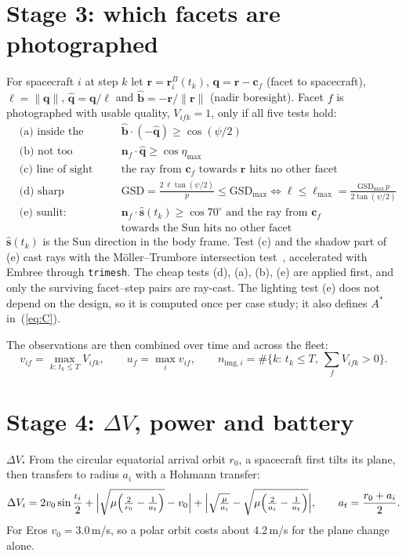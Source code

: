 \section{Stage 3: which facets are photographed}
\label{sec:visibility}
For spacecraft $i$ at step $k$ let $\mathbf{r}=\mathbf{r}^{B}_i(t_k)$,
$\mathbf{q}=\mathbf{r}-\mathbf{c}_f$ (facet to spacecraft), $\ell=\|\mathbf{q}\|$,
$\hat{\mathbf{q}}=\mathbf{q}/\ell$ and $\hat{\mathbf{b}}=-\mathbf{r}/\|\mathbf{r}\|$ (nadir
boresight). Facet $f$ is photographed with usable quality, $V_{ifk}=1$, only if all five tests
hold:
\begin{align}
&\text{(a) inside the camera cone:} && \hat{\mathbf{b}}\cdot(-\hat{\mathbf{q}})\ge\cos(\psi/2)\\
&\text{(b) not too oblique:} && \mathbf{n}_f\cdot\hat{\mathbf{q}}\ge\cos\eta_{\max}\\
&\text{(c) line of sight free:} && \text{the ray from }\mathbf{c}_f\text{ towards }\mathbf{r}\text{ hits no other facet}\\
&\text{(d) sharp enough:} && \mathrm{GSD}=\frac{2\,\ell\tan(\psi/2)}{p}\le\mathrm{GSD}_{\max}
 \iff \ell\le\ell_{\max}=\frac{\mathrm{GSD}_{\max}\,p}{2\tan(\psi/2)}\\
&\text{(e) sunlit:} && \mathbf{n}_f\cdot\hat{\mathbf{s}}(t_k)\ge\cos 70^\circ\text{ and the ray from }\mathbf{c}_f\\
&&&\text{towards the Sun hits no other facet}
\end{align}
$\hat{\mathbf{s}}(t_k)$ is the Sun direction in the body frame. Test (c) and the shadow part of
(e) cast rays with the M\"oller--Trumbore intersection test~\cite{moller1997}, accelerated with
Embree through \texttt{trimesh}. The cheap tests (d), (a), (b), (e) are applied first, and only the
surviving facet--step pairs are ray-cast. The lighting test (e) does not depend on the design, so
it is computed once per case study; it also defines $A^{*}$ in~(\ref{eq:C}).

The observations are then combined over time and across the fleet:
\begin{equation}
v_{if}=\max_{k:\,t_k\le T}V_{ifk},\qquad u_f=\max_i v_{if},\qquad
n_{\mathrm{img},i}=\#\{k:\,t_k\le T,\ \textstyle\sum_f V_{ifk}>0\}.
\end{equation}

\section{Stage 4: $\Delta V$, power and battery}
\label{sec:dv}
\textbf{$\Delta V$.} From the circular equatorial arrival orbit $r_0$, a spacecraft first tilts its
plane, then transfers to radius $a_i$ with a Hohmann transfer:
\begin{equation}
\Delta V_i=2v_0\sin\frac{\iota_i}{2}
+\Bigl|\sqrt{\mu\Bigl(\tfrac{2}{r_0}-\tfrac{1}{a_t}\Bigr)}-v_0\Bigr|
+\Bigl|\sqrt{\tfrac{\mu}{a_i}}-\sqrt{\mu\Bigl(\tfrac{2}{a_i}-\tfrac{1}{a_t}\Bigr)}\Bigr|,
\qquad a_t=\frac{r_0+a_i}{2}.
\end{equation}
For Eros $v_0=3.0$\,m/s, so a polar orbit costs about 4.2\,m/s for the plane change alone.

